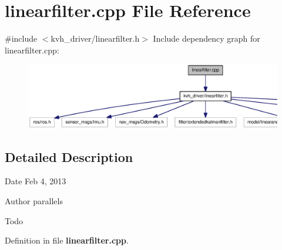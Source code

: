 \section{linearfilter.\-cpp \-File \-Reference}
\label{linearfilter_8cpp}
{\ttfamily \#include $<$kvh\-\_\-driver/linearfilter.\-h$>$}\*
\-Include dependency graph for linearfilter.\-cpp\-:
\nopagebreak
\begin{figure}[H]
\begin{center}
\leavevmode
\includegraphics[width=350pt]{linearfilter_8cpp__incl}
\end{center}
\end{figure}


\subsection{\-Detailed \-Description}
\begin{DoxyDate}{\-Date}
\-Feb 4, 2013 
\end{DoxyDate}
\begin{DoxyAuthor}{\-Author}
parallels 
\end{DoxyAuthor}
\begin{DoxyRefDesc}{\-Todo}
\item[{\bf \-Todo}]\end{DoxyRefDesc}


\-Definition in file {\bf linearfilter.\-cpp}.

